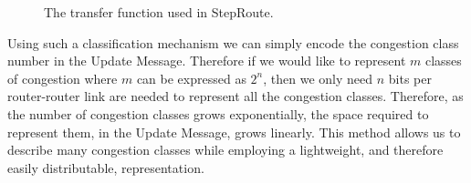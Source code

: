 \begin{figure}[htbp!]
\begin{center}


\end{center}
\caption{The transfer function used in StepRoute.}
\label{fig:SRTF}
\end{figure}

Using such a classification mechanism we can simply encode the congestion class
number in the Update Message. Therefore if we would like to represent $m$
classes of congestion where $m$ can be expressed as $2^{n}$, then we only need
$n$ bits per router-router link are needed to represent all the congestion
classes. Therefore, as the number of congestion classes grows exponentially, the
space required to represent them, in the Update Message, grows linearly.
This method allows us to describe
many congestion classes while employing a lightweight, and therefore easily
distributable, representation.




